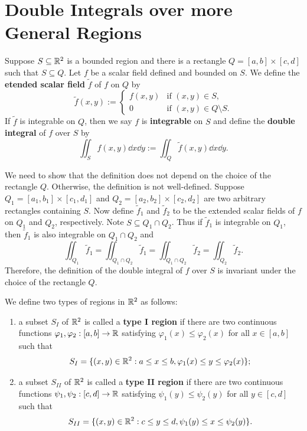 \section{Double Integrals over more General Regions}
\begin{definitionenv}
    Suppose $S\subseteq \mathbb{R}^2$ is a bounded region and there is a rectangle $Q=[a,b] \times [c,d]$ such that $S \subseteq Q$. Let $f$ be a scalar field defined and bounded on $S$. We define the \textbf{etended scalar field} $\widetilde f$ of $f$ on $Q$ by
    $$
    \widetilde f(x,y) := \begin{cases}
    f(x,y) & \text{if } (x,y) \in S,\\
    0 & \text{if } (x,y) \in Q\setminus S.
    \end{cases}
    $$
    If $\widetilde f$ is integrable on $Q$, then we say $f$ is \textbf{integrable} on $S$ and define the \textbf{double integral} of $f$ over $S$ by
    $$\iint_S f(x,y) \dd x \dd y := \iint_Q \widetilde f(x,y) \dd x \dd y.$$
\end{definitionenv}
\begin{remarkenv}
    We need to show that the definition does not depend on the choice of the rectangle $Q$. Otherwise, the definition is not well-defined. Suppose $Q_1=[a_1,b_1] \times [c_1,d_1]$ and $Q_2=[a_2,b_2] \times [c_2,d_2]$ are two arbitrary rectangles containing $S$. Now define $\widetilde f_1$ and $\widetilde f_2$ to be the extended scalar fields of $f$ on $Q_1$ and $Q_2$, respectively. Note $S\subseteq Q_1 \cap Q_2$. Thus if $\widetilde f_1$ is integrable on $Q_1$, then $\widetilde f_1$ is also integrable on $Q_1 \cap Q_2$ and
    $$\iint_{Q_1} \widetilde f_1 = \iint_{Q_1 \cap Q_2} \widetilde f_1 = \iint_{Q_1 \cap Q_2} \widetilde f_2 = \iint_{Q_2} \widetilde f_2.$$
    Therefore, the definition of the double integral of $f$ over $S$ is invariant under the choice of the rectangle $Q$.
\end{remarkenv}
\begin{definitionenv}
    We define two types of regions in $\mathbb{R}^2$ as follows:
    \begin{enumerate}[label=(\arabic*)]
        \item a subset $S_I$ of $\mathbb{R}^2$ is called a \textbf{type I region} if there are two continuous functions $\varphi_1, \varphi_2: [a,b] \to \mathbb{R}$ satisfying $\varphi_1(x) \leq \varphi_2(x)$ for all $x \in [a,b]$ such that
        $$ S_I = \{(x,y) \in \mathbb{R}^2 : a \leq x \leq b, \varphi_1(x) \leq y \leq \varphi_2(x)\}; $$
        \item a subset $S_{II}$ of $\mathbb{R}^2$ is called a \textbf{type II region} if there are two continuous functions $\psi_1, \psi_2: [c,d] \to \mathbb{R}$ satisfying $\psi_1(y) \leq \psi_2(y)$ for all $y \in [c,d]$ such that
        $$ S_{II} = \{(x,y) \in \mathbb{R}^2 : c \leq y \leq d, \psi_1(y) \leq x \leq \psi_2(y)\}. $$
    \end{enumerate}
\end{definitionenv}
